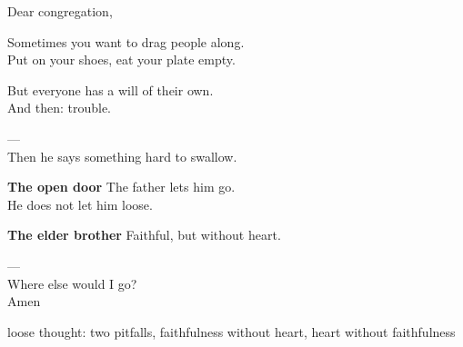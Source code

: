 


\large

Dear congregation,

Sometimes you want to drag people along.\\
Put on your shoes, eat your plate empty.

But everyone has a will of their own.\\
And then: trouble.

---\\
Then he says something hard to swallow.\\

\textbf{The open door}
The father lets him go.\\
He does not let him loose.

\textbf{The elder brother}
Faithful, but without heart.

---\\
Where else would I go?\\
Amen



loose thought: two pitfalls, faithfulness without heart, heart without faithfulness
